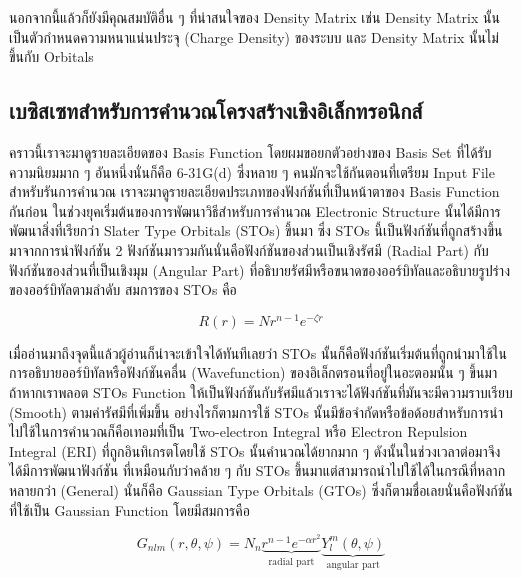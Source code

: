 นอกจากนี้แล้วก็ยังมีคุณสมบัติอื่น ๆ ที่น่าสนใจของ Density Matrix เช่น Density Matrix นั้นเป็นตัวกำหนดความหนาแน่นประจุ (Charge 
Density) ของระบบ และ Density Matrix นั้นไม่ขึ้นกับ Orbitals 

\subsection{เบซิสเซทสำหรับการคำนวณโครงสร้างเชิงอิเล็กทรอนิกส์}

คราวนี้เราจะมาดูรายละเอียดของ Basis Function โดยผมขอยกตัวอย่างของ Basis Set ที่ได้รับความนิยมมาก ๆ อันหนึ่งนั่นก็คือ 6-31G(d) 
ซึ่งหลาย ๆ คนมักจะใช้กันตอนที่เตรียม Input File สำหรับรันการคำนวณ เราจะมาดูรายละเอียดประเภทของฟังก์ชันที่เป็นหน้าตาของ Basis Function 
กันก่อน ในช่วงยุคเริ่มต้นของการพัฒนาวิธีสำหรับการคำนวณ Electronic Structure นั้นได้มีการพัฒนาสิ่งที่เรียกว่า Slater Type Orbitals 
(STOs) ขึ้นมา ซึ่ง STOs นี้เป็นฟังก์ชันที่ถูกสร้างขึ้นมาจากการนำฟังก์ชัน 2 ฟังก์ชันมารวมกันนั่นคือฟังก์ชันของส่วนเป็นเชิงรัศมี (Radial Part) 
กับฟังก์ชันของส่วนที่เป็นเชิงมุม (Angular Part) ที่อธิบายรัศมีหรือขนาดของออร์บิทัลและอธิบายรูปร่างของออร์บิทัลตามลำดับ สมการของ STOs คือ

\begin{equation}
    \label{eq:sto}
    R(r) = N r^{n - 1} e^{-\zeta r}
\end{equation}

เมื่ออ่านมาถึงจุดนี้แล้วผู้อ่านก็น่าจะเข้าใจได้ทันทีเลยว่า STOs นั้นก็คือฟังก์ชันเริ่มต้นที่ถูกนำมาใช้ในการอธิบายออร์บิทัลหรือฟังก์ชันคลื่น (Wavefunction) 
ของอิเล็กตรอนที่อยู่ในอะตอมนั้น ๆ ขึ้นมา ถ้าหากเราพลอต STOs Function ให้เป็นฟังก์ชันกับรัศมีแล้วเราจะได้ฟังก์ชันที่มันจะมีความราบเรียบ (Smooth) 
ตามค่ารัศมีที่เพิ่มขึ้น อย่างไรก็ตามการใช้ STOs นั้นมีข้อจำกัดหรือข้อด้อยสำหรับการนำไปใช้ในการคำนวณก็คือเทอมที่เป็น Two-electron Integral 
หรือ Electron Repulsion Integral (ERI) ที่ถูกอินทิเกรตโดยใช้ STOs นั้นคำนวณได้ยากมาก ๆ ดังนั้นในช่วงเวลาต่อมาจึงได้มีการพัฒนาฟังก์ชัน%
ที่เหมือนกับว่าคล้าย ๆ กับ STOs ขึ้นมาแต่สามารถนำไปใช้ได้ในกรณีที่หลากหลายกว่า (General) นั่นก็คือ Gaussian Type Orbitals (GTOs) 
ซึ่งก็ตามชื่อเลยนั่นคือฟังก์ชันที่ใช้เป็น Gaussian Function โดยมีสมการคือ

\begin{equation}
    \label{eq:gto}
    G_{nlm} (r, \theta , \psi ) 
    = N_n 
        \underbrace{r^{n-1} e^{-\alpha r^2}}_{\text{radial part}} 
        \underbrace{Y^m_l (\theta, \psi)}_{\text{angular part}}
\end{equation}

